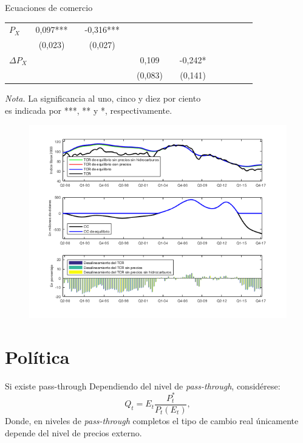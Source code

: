 \documentclass{beamer}
\begin{document}
\begin{frame}{Ecuaciones de comercio}
\begin{table}
\begin{center}
\begin{threeparttable}
{\begin{tabular}{lcccccccccccc}
$P_X$			&	0,097***	&					& -0,316***	&					&					&					&							&							&					&					&						&				\\
					&	(0,023)		&					& (0,027)		&					&					&					&							&							&					&					&						&				\\
$\Delta P_X$	&					&					&					&					&	0,109		&					& -0,242*				&							&					&					&						&				\\
					&					&					&					&					&	(0,083)		&					& (0,141)				&							&					&					&						&				\\
\hline									
\hline									
\end{tabular}
}	
\begin{tablenotes}
\small
\item  \emph{Nota.} La significancia al uno, cinco y diez por ciento \\ es indicada por ***, ** y *, respectivamente.
\end{tablenotes}								
\end{threeparttable}					
\end{center}
\end{table}	
\end{frame}

\begin{frame}
\begin{figure}
\centering
\includegraphics[scale=0.5]{deer}
\end{figure}
\end{frame}

\section[Política]{Política}
\begin{frame}{Si existe pass-through}
Dependiendo del nivel de \emph{pass-through}, considérese:
\begin{equation}
Q_t=E_t\frac{P_t^*}{P_t(E_t)},
\end{equation}
Donde, en niveles de \emph{pass-through} completos el tipo de cambio real únicamente depende del nivel de precios externo.
\end{frame}
\end{document}
